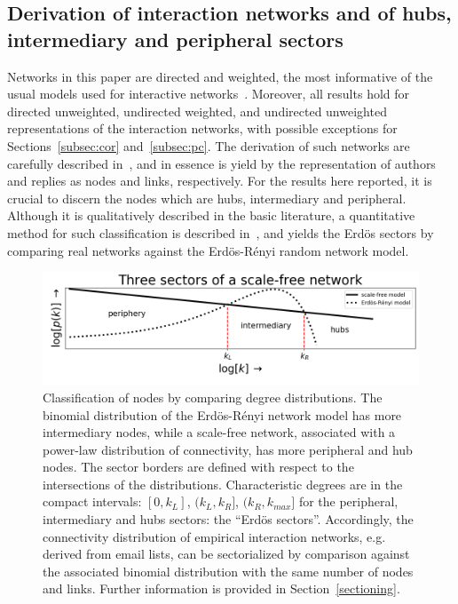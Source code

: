 \documentclass[review]{elsarticle}
\begin{document}
\subsection{Derivation of interaction networks and of hubs, intermediary and peripheral sectors}\label{intNet}\label{sectioning}
Networks in this paper are directed and weighted,
the most informative of the usual models used
for interactive networks~\cite{bird,newmanCommunityDirected,newmanCommunity2013}. Moreover, all results hold for directed unweighted, undirected weighted, and undirected unweighted representations of the interaction networks,
with possible exceptions for Sections~\ref{subsec:cor} and~\ref{subsec:pc}.
The derivation of such networks are carefully described in~\cite{stab}, and in essence is yield by the representation of authors and replies as nodes and links, respectively.
For the results here reported, it is crucial to discern the nodes which are hubs, intermediary and peripheral.
Although it is qualitatively described in the basic literature, a quantitative
method for such classification is described in~\cite{stab},
and yields the Erd\"os sectors by comparing real networks
against the Erd\"os-R\'enyi random network model.

\begin{figure}[!h]
\centering
\includegraphics[width=\textwidth]{figs/fser_}
\caption{Classification of nodes by comparing degree
distributions.
The binomial distribution of the Erd\"os-R\'enyi network model has more intermediary nodes, while a scale-free network, associated with a power-law distribution of connectivity, has more peripheral and hub nodes.
  The sector borders are defined with respect to the intersections of the distributions.
  Characteristic degrees are in the compact intervals: $[0,k_L]$, $(k_L,k_R]$, $(k_R,k_{max}]$ for the peripheral, intermediary and hubs sectors: the ``Erd\"os sectors''.
Accordingly, the connectivity distribution of empirical interaction networks, e.g. derived from email lists, can be sectorialized by comparison against the associated binomial distribution with the same number of nodes and links.
  Further information is provided in Section~\ref{sectioning}.}
\label{fig:setores}
\end{figure}
\end{document}
